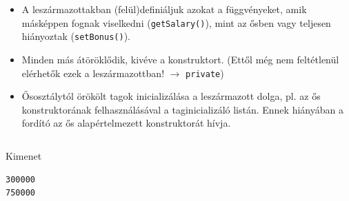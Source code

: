 \begin{frame}
    \begin{itemize}
        \item A leszármazottakban (felül)definiáljuk azokat a függvényeket, amik másképpen fognak viselkedni (\texttt{getSalary()}), mint az ősben vagy teljesen hiányoztak (\texttt{setBonus()}).
        \item Minden más átöröklődik, kivéve a konstruktort. (Ettől még nem feltétlenül elérhetők ezek a leszármazottban! $\to$ \texttt{private})
        \item Ősosztálytól örökölt tagok inicializálása a leszármazott dolga, pl. az ős konstruktorának felhasználásával a taginicializáló listán. Ennek hiányában a fordító az ős alapértelmezett konstruktorát hívja.
    \end{itemize}
\end{frame}

\begin{frame}
    \begin{columns}[T]
            \begin{exampleblock}{}
                \vspace{-.2cm}
                \fontsize{7}{8} \selectfont
                
                \vspace{-.2cm}
            \end{exampleblock}
            \begin{exampleblock}{}
                \vspace{-.2cm}
                \fontsize{7}{8} \selectfont
                
                \vspace{-.2cm}
            \end{exampleblock}
    \end{columns}
\end{frame}

\begin{frame}[fragile]
    \begin{exampleblock}{}
        \footnotesize
        
    \end{exampleblock}
    \begin{block}{Kimenet}
        \footnotesize
        \vspace{-.3cm}
        \begin{verbatim}
300000
750000
        \end{verbatim}
        \vspace{-.6cm}
    \end{block}
\end{frame}

